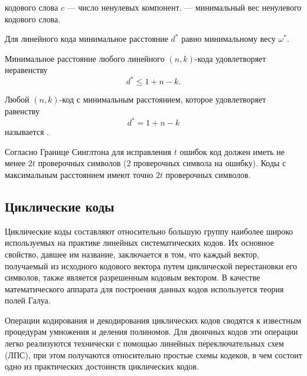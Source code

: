 \begin{definition}  кодового слова $c$ --- число ненулевых компонент.
 --- минимальный вес ненулевого кодового слова.
\end{definition}

\begin{theorem} 
Для линейного кода минимальное расстояние $d^*$ равно минимальному весу $\omega^*$.
\end{theorem}

\begin{theorem} 
Минимальное расстояние любого линейного $(n, k)$-кода удовлетворяет неравенству $$d^* \leq 1+n-k.$$
\end{theorem}

\begin{definition}
Любой $(n, k)$-код с минимальным расстоянием, которое удовлетворяет равенству $$d^*=1+n-k$$ называется
.
\end{definition}

Согласно Границе Синглтона для исправления $t$ ошибок код должен иметь не менее $2t$ проверочных
символов (2 проверочных символа на ошибку). Коды с максимальным расстоянием имеют точно $2t$
проверочных символов.

\subsection{Циклические коды}
Циклические коды составляют относительно большую группу наиболее широко используемых на 
практике линейных систематических кодов. Их основное свойство, давшее им название, 
заключается в том, что каждый вектор, получаемый из исходного кодового вектора путем 
циклической перестановки его символов, также является разрешенным кодовым вектором.
В качестве математического аппарата для построения данных кодов используется теория полей Галуа.

Операции кодирования и декодирования циклических кодов сводятся к известным процедурам 
умножения и деления полиномов. Для двоичных кодов эти операции легко реализуются 
технически с помощью линейных переключательных схем (ЛПС), при этом получаются 
относительно простые схемы кодеков, в чем состоит одно из практических достоинств циклических кодов.

